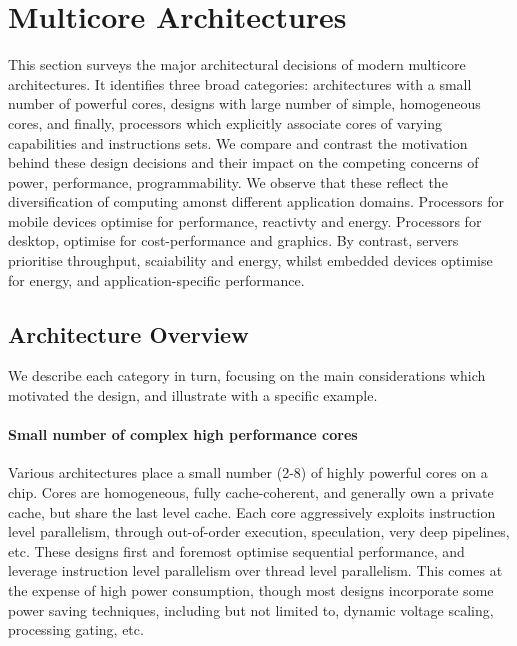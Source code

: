 
\section{Multicore Architectures}
This section surveys the major architectural decisions of modern multicore 
architectures. It identifies three broad categories:
architectures with a small number of powerful cores, designs with large number of simple, homogeneous cores, and
finally, processors which explicitly associate
cores of varying capabilities and instructions sets.
We compare and contrast the motivation behind these
design decisions and their impact on the competing
concerns of power, performance, programmability.
We observe that these reflect the diversification of computing
amonst different application domains. Processors for mobile devices
optimise for performance, reactivty and energy. Processors for desktop, 
optimise for cost-performance and  graphics. By contrast,
servers prioritise throughput, scaiability and energy, whilst
embedded devices optimise for energy, and application-specific
performance. 

\subsection{Architecture Overview}

We describe each category in turn, focusing on the main 
considerations which motivated the design, and illustrate
with a specific example.

\paragraph{Small number of complex high performance cores}
Various architectures place a small number (2-8) of highly
powerful cores on a chip.  Cores are homogeneous, fully cache-coherent,
and generally own a private cache, but share the last level cache. 
Each core aggressively exploits instruction level parallelism, through
out-of-order execution, speculation, very deep pipelines, etc. 
These designs first and foremost optimise sequential performance, 
and leverage instruction level parallelism over thread level parallelism. 
This comes at the expense of high power consumption, 
though most designs incorporate some power
saving techniques, including but not limited to, dynamic 
voltage scaling, processing gating, etc.

